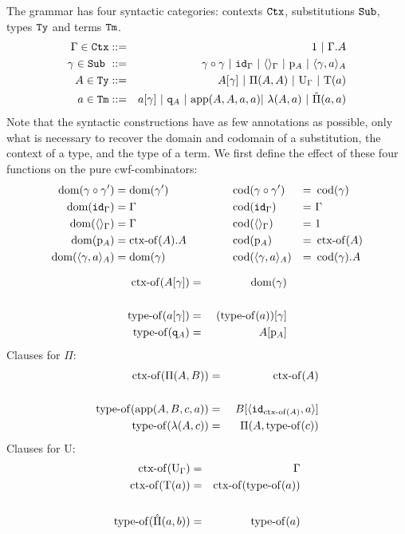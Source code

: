 \documentclass{lmcs}
\def\UU{\mathrm{U}}
\def\Ta{\mathrm{T}}
\def\Pihat{\hat{\Pi}}
\begin{document}
The grammar has four syntactic categories: contexts ${\tt Ctx}$,
substitutions ${\tt Sub}$, types ${\tt Ty}$ and terms ${\tt Tm}$.
\begin{eqnarray*}
\Gamma \in \RawCtx &::=& 1  \ |\ \Gamma.A\\
\gamma \in \RawSub \ &::=& \gamma \circ \gamma \ |\ \id_\Gamma \ |\ \langle\rangle_\Gamma \ |\ \p_{A} \ |\ \langle \gamma, a \rangle_A\\
A \in \RawTy &::=& A[\gamma]   \ |\  \Pi(A,A)\ |\  \UU_\Gamma  \ |\  \Ta(a)\\
a \in \RawTm &::=& a[\gamma] \ |\ \qI_A\ |\  \ap(A,A,a,a) |\ \lambda(A,a)\ |\ \hat{\Pi}(a,a)
\end{eqnarray*}
Note that the syntactic constructions have as few annotations as possible, only what is
necessary to recover the domain and codomain of a substitution, the context of a type, and the type of a term. We first define the effect of these four functions on the pure cwf-combinators:
\begin{align*}
\operatorname{dom}(\gamma \circ \gamma') &= \operatorname{dom}(\gamma') \quad&\quad\quad & \operatorname{cod}(\gamma \circ \gamma') &=&\  \operatorname{cod}(\gamma)\\
\operatorname{dom}({\tt id}_\Gamma) &= \Gamma\quad& &\operatorname{cod}({\tt id}_\Gamma) &=&\  \Gamma\\
\operatorname{dom}(\langle\rangle_\Gamma) &= \Gamma\quad&&\operatorname{cod}(\langle\rangle_\Gamma) &=&\  1\\
\operatorname{dom}(\mathrm{p}_{A}) &= \operatorname{ctx-of}(A).A\quad&&\operatorname{cod}(\mathrm{p}_{A}) &=&\  \operatorname{ctx-of}(A) \\
\operatorname{dom}(\langle \gamma, a \rangle_A) &= \operatorname{dom}(\gamma)\quad&&\operatorname{cod}(\langle \gamma, a \rangle_A) &=&\  \operatorname{cod}(\gamma).A
\end{align*}

\begin{eqnarray*}
\operatorname{ctx-of}(A[\gamma]) &=& \operatorname{dom}(\gamma)\\
&&\\
\operatorname{type-of}(a[\gamma]) &=&\ (\operatorname{type-of}(a))[\gamma]\\
\operatorname{type-of}({\tt q}_A) &=&\ A[\mathrm{p}_{A}]
\end{eqnarray*}
Clauses for $\Pi$:
\begin{eqnarray*}
\operatorname{ctx-of}(\Pi(A,B)) &=& \operatorname{ctx-of}(A)\\
&&\\
\operatorname{type-of}(\mathrm{app}(A,B,c,a)) &=&\ B[\langle {\tt id}_{\operatorname{ctx-of}(A)},a \rangle ]\\
\quad \operatorname{type-of}(\lambda(A,c)) &=& \Pi(A,\operatorname{type-of}(c))
\end{eqnarray*}
Clauses for $\UU$:
\begin{eqnarray*}
\ctxof(\UU_\Gamma) &=& \Gamma\\
\ctxof(\Ta(a)) &=& \ctxof(\typeof(a))\\
&&\\
\typeof(\Pihat(a,b))&=& \typeof(a)
\end{eqnarray*}
\end{document}
